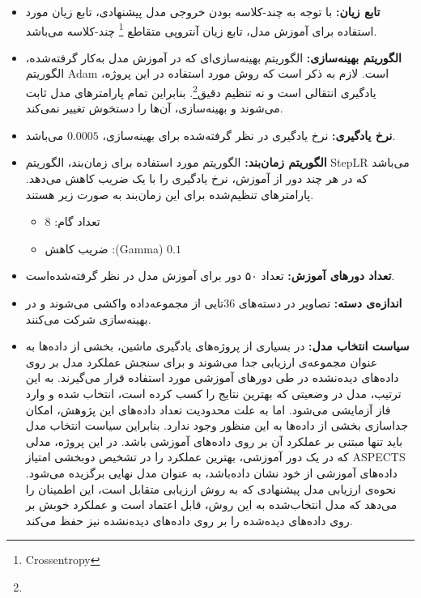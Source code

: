 \begin{itemize}
    \item \textbf{تابع زیان:} با توجه به چند-کلاسه بودن خروجی مدل پیشنهادی، تابع زیان مورد استفاده برای آموزش مدل، تابع زیان آنتروپی متقاطع
    \footnote{Crossentropy}
    چند-کلاسه می‌باشد.
    \item \textbf{الگوریتم بهینه‌سازی:} الگوریتم بهینه‌سازی‌ای که در آموزش مدل به‌کار گرفته‌شده، الگوریتم Adam است.
    لازم به ذکر است که روش مورد استفاده در این پروژه، یادگیری انتقالی است و نه تنظیم دقیق\footnote{}. بنابراین تمام پارامتر‌های مدل  ثابت می‌شوند و بهینه‌سازی، آن‌ها را دستخوش تغییر نمی‌کند.
    \item \textbf{نرخ یادگیری:} نرخ یادگیری در نظر گرفته‌شده برای بهینه‌سازی، $0.0005$ می‌باشد.
    \item \textbf{الگوریتم زمان‌بند:} الگوریتم مورد استفاده برای زمان‌بند، الگوریتم StepLR می‌باشد که در هر چند دور از آموزش، نرخ یادگیری را با یک ضریب کاهش می‌دهد. پارامتر‌های تنظیم‌شده برای این زمان‌بند به صورت زیر هستند.
    \begin{itemize}
        \item تعداد گام: 8
        \item ضریب کاهش :(Gamma) $0.1$
    \end{itemize}
    \item \textbf{تعداد دور‌های آموزش:} تعداد ۵۰ دور برای آموزش مدل در نظر گرفته‌شده‌است.
    \item \textbf{اندازه‌ی دسته:} تصاویر در دسته‌های 36تایی از مجموعه‌داده واکشی می‌شوند و در بهینه‌سازی شرکت می‌کنند.
    \item \textbf{سیاست انتخاب مدل:} در بسیاری از پروژه‌های یادگیری ماشین، بخشی از داده‌ها به عنوان مجموعه‌ی ارزیابی جدا می‌شوند و برای سنجش عملکرد مدل بر روی داده‌های دیده‌نشده در طی دور‌های آموزشی مورد استفاده قرار می‌گیرند.
    به این ترتیب، مدل در وضعیتی که بهترین نتایج را کسب کرده است، انتخاب شده و وارد فاز آزمایشی می‌شود.
    اما به علت محدودیت تعداد داده‌های این پژوهش، امکان جداسازی بخشی از داده‌ها به این منظور وجود ندارد.
    بنابراین سیاست انتخاب مدل باید تنها مبتنی بر عملکرد آن بر روی داده‌های آموزشی باشد.
    در این پروژه، مدلی که در یک دور آموزشی، بهترین عملکرد را در تشخیص دوبخشی امتیاز ASPECTS داده‌های آموزشی از خود نشان داده‌باشد، به عنوان مدل نهایی برگزیده می‌شود.
    نحوه‌ی ارزیابی مدل پیشنهادی که به روش ارزیابی متقابل است، این اطمینان را می‌دهد که مدل انتخاب‌شده به این روش، قابل اعتماد است و عملکرد خوبش بر روی داده‌های دیده‌شده را بر روی داده‌های دیده‌نشده نیز حفظ می‌کند.
\end{itemize}


